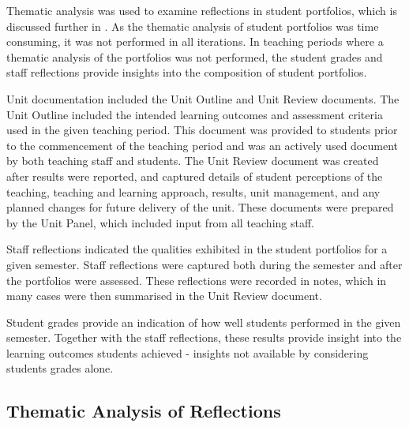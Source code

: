 Thematic analysis was used to examine reflections in student portfolios, which is discussed further in . As the thematic analysis of student portfolios was time consuming, it was not performed in all iterations. In teaching periods where a thematic analysis of the portfolios was not performed, the student grades and staff reflections provide insights into the composition of student portfolios.

Unit documentation included the Unit Outline and Unit Review documents. The Unit Outline included the intended learning outcomes and assessment criteria used in the given teaching period. This document was provided to students prior to the commencement of the teaching period and was an actively used document by both teaching staff and students. The Unit Review document was created after results were reported, and captured details of student perceptions of the teaching, teaching and learning approach, results, unit management, and any planned changes for future delivery of the unit. These documents were prepared by the Unit Panel, which included input from all teaching staff.


Staff reflections indicated the qualities exhibited in the student portfolios for a given semester. Staff reflections were captured both during the semester and after the portfolios were assessed. These reflections were recorded in notes, which in many cases were then summarised in the Unit Review document.

Student grades provide an indication of how well students performed in the given semester. Together with the staff reflections, these results provide insight into the learning outcomes students achieved - insights not available by considering students grades alone.


\subsection{Thematic Analysis of Reflections} %
\label{sub:thematic_analysis}


